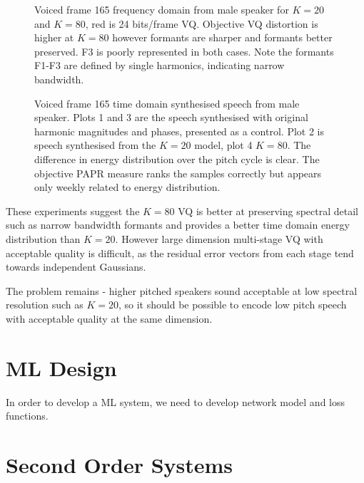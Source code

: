 \documentclass{article}
\begin{document}
\begin{figure}
\caption{Voiced frame 165 frequency domain from male speaker for $K=20$ and $K=80$, red is 24 bits/frame VQ. Objective VQ distortion is higher at $K=80$ however formants are sharper and formants better preserved.  F3 is poorly represented in both cases.  Note the formants F1-F3 are defined by single harmonics, indicating narrow bandwidth.}
\label{fig:big_dog_f165_freq}
\begin{center}


\end{center}
\end{figure}

\begin{figure}
\caption{Voiced frame 165 time domain synthesised speech from male speaker.  Plots 1 and 3 are the speech synthesised with original harmonic magnitudes and phases, presented as a control.  Plot 2 is speech synthesised from the $K=20$ model, plot 4 $K=80$. The difference in energy distribution over the pitch cycle is clear.  The objective PAPR measure ranks the samples correctly but appears only weekly related to energy distribution.}
\label{fig:big_dog_f165_time}
\begin{center}


\end{center}
\end{figure}

These experiments suggest the $K=80$ VQ is better at preserving spectral detail such as narrow bandwidth formants and provides a better time domain energy distribution than $K=20$.  However large dimension multi-stage VQ with acceptable quality is difficult, as the residual error vectors from each stage tend towards independent Gaussians.

The problem remains - higher pitched speakers sound acceptable at low spectral resolution such as $K=20$, so it should be possible to encode low pitch speech with acceptable quality at the same dimension.

\section{ML Design}

In order to develop a ML system, we need to develop network model and loss functions.

\section{Second Order Systems}
\end{document}
